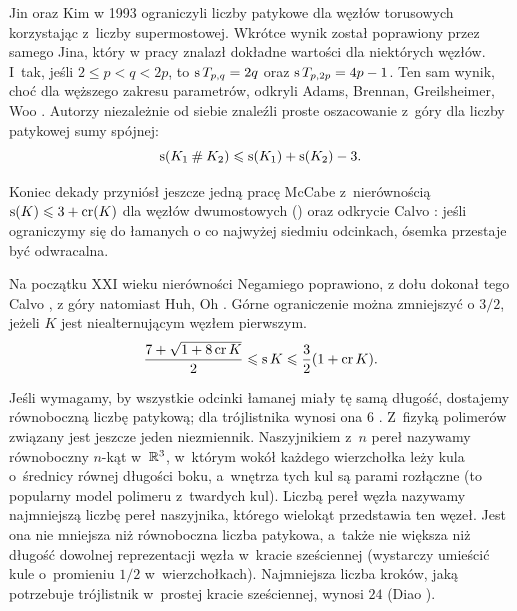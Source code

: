 Jin oraz Kim w 1993 ograniczyli liczby patykowe dla węzłów torusowych korzystając z~liczby supermostowej.
%
%
Wkrótce wynik został poprawiony przez samego Jina, który w pracy \cite{jin1997} znalazł dokładne wartości dla niektórych węzłów.
I~tak, jeśli $2 \le p < q < 2p$, to $\operatorname{s} T_{p,q} = 2q$ oraz $\operatorname{s} T_{p, 2p} = 4p-1$.
Ten sam wynik, choć dla węższego zakresu parametrów, odkryli Adams, Brennan, Greilsheimer, Woo \cite{greilsheimer1997}.
%
%
%
%
%
Autorzy niezależnie od siebie znaleźli proste oszacowanie z~góry dla liczby patykowej sumy spójnej:
\label{stick_bounded_factors}%
\begin{equation}
    \operatorname{s}(K_1 \mathbin{\#} K_2) \leqslant \operatorname{s}(K_1) + \operatorname{s}(K_2) - 3.
\end{equation}

Koniec dekady przyniósł jeszcze jedną pracę McCabe z~nierównością $\operatorname{s}(K) \leqslant 3 + \operatorname{cr} (K)$ dla węzłów dwumostowych (\cite{mccabe1998}) oraz odkrycie Calvo \cite{calvo2001}: jeśli ograniczymy się do łamanych o co najwyżej siedmiu odcinkach, ósemka przestaje być odwracalna.
%
%

Na początku XXI wieku nierówności Negamiego poprawiono, z dołu dokonał tego Calvo \cite{calvo2001}, z góry natomiast Huh, Oh \cite{huh2011}.
%
%
%
Górne ograniczenie można zmniejszyć o $3/2$, jeżeli $K$ jest niealternującym węzłem pierwszym.
\begin{equation}
    \frac{7+\sqrt{1 + 8 \operatorname{cr} K}}{2} \leqslant \operatorname{s} K \leqslant \frac{3}{2} (1 + \operatorname{cr} K).
\end{equation}

Jeśli wymagamy, by wszystkie odcinki łamanej miały tę samą długość, dostajemy równoboczną liczbę patykową; dla trójlistnika wynosi ona $6$ \cite{jin1997}.
Z~fizyką polimerów związany jest jeszcze jeden niezmiennik.
Naszyjnikiem z~$n$ pereł nazywamy równoboczny $n$-kąt w~$\mathbb R^3$, w~którym wokół każdego wierzchołka leży kula o~średnicy równej długości boku, a~wnętrza tych kul są parami rozłączne (to popularny model polimeru z~twardych kul).
Liczbą pereł węzła nazywamy najmniejszą liczbę pereł naszyjnika, którego wielokąt przedstawia ten węzeł.
Jest ona nie mniejsza niż równoboczna liczba patykowa, a~także nie większa niż długość dowolnej reprezentacji węzła w~kracie sześciennej (wystarczy umieścić kule o~promieniu $1/2$ w~wierzchołkach).
%
Najmniejsza liczba kroków, jaką potrzebuje trójlistnik w~prostej kracie sześciennej, wynosi $24$ (Diao \cite{diao1993}).
%

